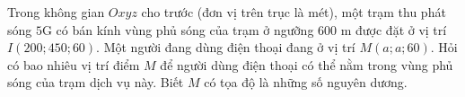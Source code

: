 \begin{ex}%
	Trong không gian $Oxyz$ cho trước (đơn vị trên trục là mét), một trạm thu phát sóng $5$G có bán kính vùng phủ sóng của trạm ở ngưỡng $600$ m được đặt ở vị trí $I(200 ; 450 ; 60)$. Một người đang dùng điện thoại đang ở vị trí $M(a ; a ; 60)$. Hỏi có bao nhiêu vị trí điểm $M$ để người dùng điện thoại có thể nằm trong vùng phủ sóng của trạm dịch vụ này. Biết $M$ có tọa độ là những số nguyên dương.
\end{ex}

